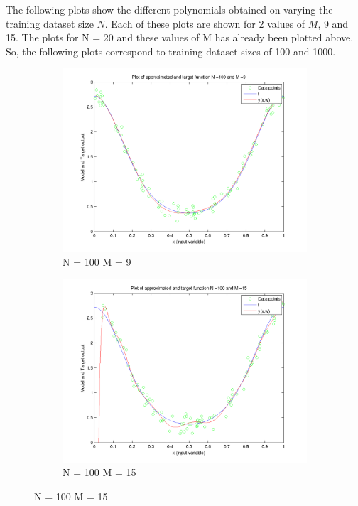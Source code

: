 \documentclass{article}
\makeatletter
\renewcommand\paragraph{\@startsection{paragraph}{4}{\z@}%
            {-2.5ex\@plus -1ex \@minus -.25ex}%
            {1.25ex \@plus .25ex}%
            {\normalfont\normalsize\bfseries}}
\makeatother
\begin{document}
\begin{flushleft}
The following plots show the different polynomials obtained on varying the training dataset size $N$. Each of these plots are shown for 2 values of $M$, 9 and 15.
The plots for N = 20 and these values of M has already been plotted above. So, the following plots correspond to training dataset sizes of 100 and 1000. 
\end{flushleft}
\begin{figure}[H]

\begin{subfigure}{.5\textwidth}
\centering
\includegraphics[width=\linewidth]{VaryingN_N100M9}
\caption{N = 100 M = 9}
\end{subfigure}
\begin{subfigure}{.5\textwidth}
\includegraphics[width=\linewidth]{VaryingN_N100M15}
\caption{N = 100 M = 15}
\end{subfigure}



\end{figure}
\end{document}
